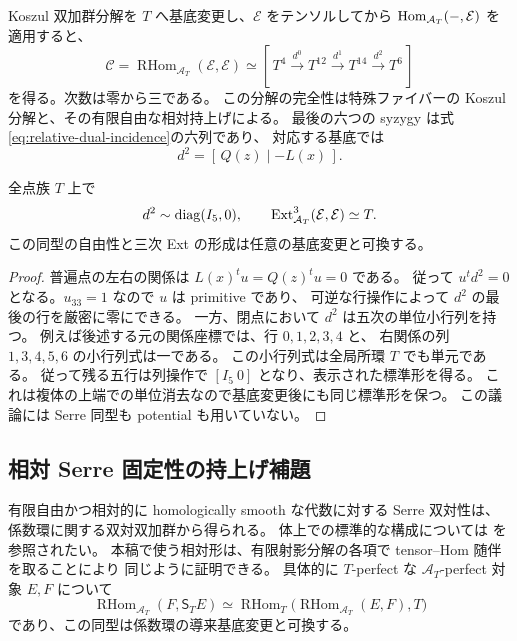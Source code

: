 Koszul 双加群分解を $T$ へ基底変更し、$\mathcal E$ をテンソルしてから
$\operatorname{Hom}_{\mathcal A_T}(-,\mathcal E)$ を適用すると、
\begin{equation}\label{eq:universal-self-ext-complex}
 \mathcal C=\operatorname{RHom}_{\mathcal A_T}(\mathcal E,\mathcal E)
 \simeq
 [\,T^4\xrightarrow{d^0}T^{12}\xrightarrow{d^1}T^{14}
       \xrightarrow{d^2}T^6\,]
\end{equation}
を得る。次数は零から三である。
この分解の完全性は特殊ファイバーの Koszul 分解と、その有限自由な相対持上げによる。
最後の六つの syzygy は式\eqref{eq:relative-dual-incidence}の六列であり、
対応する基底では
\begin{equation}\label{eq:relative-top-differential}
 d^2=[\,Q(z)\mid-L(x)\,].
\end{equation}

\begin{lemma}\label{lem:ext3-free}
全点族 $T$ 上で
\[
 d^2\sim\operatorname{diag}(I_5,0),\qquad
 \operatorname{Ext}^3_{\mathcal A_T}(\mathcal E,\mathcal E)\simeq T.
\]
この同型の自由性と三次 Ext の形成は任意の基底変更と可換する。
\end{lemma}

\begin{proof}
普遍点の左右の関係は $L(x)^tu=Q(z)^tu=0$ である。
従って $u^td^2=0$ となる。$u_{33}=1$ なので $u$ は primitive であり、
可逆な行操作によって $d^2$ の最後の行を厳密に零にできる。
一方、閉点において $d^2$ は五次の単位小行列を持つ。
例えば後述する元の関係座標では、行 $0,1,2,3,4$ と、
右関係の列 $1,3,4,5,6$ の小行列式は一である。
この小行列式は全局所環 $T$ でも単元である。
従って残る五行は列操作で $[I_5\ 0]$ となり、表示された標準形を得る。
これは複体の上端での単位消去なので基底変更後にも同じ標準形を保つ。
この議論には Serre 同型も potential も用いていない。
\end{proof}

\subsection{相対 Serre 固定性の持上げ補題}

有限自由かつ相対的に homologically smooth な代数に対する Serre 双対性は、
係数環に関する双対双加群から得られる。
体上での標準的な構成については \cite{Shklyarov} を参照されたい。
本稿で使う相対形は、有限射影分解の各項で tensor--Hom 随伴を取ることにより
同じように証明できる。
具体的に $T$-perfect な $\mathcal A_T$-perfect 対象 $E,F$ について
\begin{equation}\label{eq:relative-serre-duality}
 \operatorname{RHom}_{\mathcal A_T}(F,\mathsf S_T E)
 \simeq
 \operatorname{RHom}_T
  \bigl(\operatorname{RHom}_{\mathcal A_T}(E,F),T\bigr)
\end{equation}
であり、この同型は係数環の導来基底変更と可換する。

